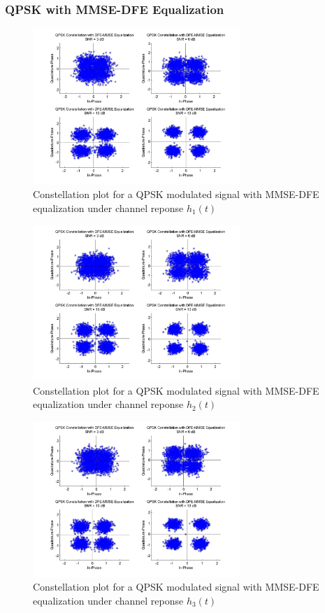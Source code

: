 \documentclass[]{article}
\begin{document}
\subsubsection{QPSK with MMSE-DFE Equalization}

\begin{figure}[H]
\centering
\includegraphics[width=0.7\textwidth]{qpConstDFEMMSE1.jpg}
\caption{Constellation plot for a QPSK modulated signal with MMSE-DFE equalization under channel reponse $h_1(t)$}
\end{figure}

\begin{figure}[H]
\centering
\includegraphics[width=0.7\textwidth]{qpConstDFEMMSE2.jpg}
\caption{Constellation plot for a QPSK modulated signal with MMSE-DFE equalization under channel reponse $h_2(t)$}
\end{figure}

\begin{figure}[H]
\centering
\includegraphics[width=0.7\textwidth]{qpConstDFEMMSE3.jpg}
\caption{Constellation plot for a QPSK modulated signal with MMSE-DFE equalization under channel reponse $h_3(t)$}
\end{figure}
\end{document}
